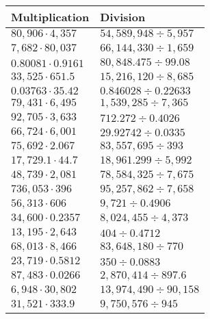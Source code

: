 \begin{longtable}[]{@{}ll@{}}
\toprule
Multiplication & Division\tabularnewline
\midrule
\endhead
\(80,906\cdot4,357\) & \(54,589,948÷5,957\)\tabularnewline
\(7,682\cdot80,037\) & \(66,144,330÷1,659\)\tabularnewline
\(0.80081\cdot0.9161\) & \(80,848.475÷99.08\)\tabularnewline
\(33,525\cdot651.5\) & \(15,216,120÷8,685\)\tabularnewline
\(0.03763\cdot35.42\) & \(0.846028÷0.22633\)\tabularnewline
\(79,431\cdot6,495\) & \(1,539,285÷7,365\)\tabularnewline
\(92,705\cdot3,633\) & \(712.272÷0.4026\)\tabularnewline
\(66,724\cdot6,001\) & \(29.92742÷0.0335\)\tabularnewline
\(75,692\cdot2.067\) & \(83,557,695÷393\)\tabularnewline
\(17,729.1\cdot44.7\) & \(18,961.299÷5,992\)\tabularnewline
\(48,739\cdot2,081\) & \(78,584,325÷7,675\)\tabularnewline
\(736,053\cdot396\) & \(95,257,862÷7,658\)\tabularnewline
\(56,313\cdot606\) & \(9,721÷0.4906\)\tabularnewline
\(34,600\cdot 0.2357\) & \(8,024,455÷4,373\)\tabularnewline
\(13,195\cdot2,643\) & \(404÷0.4712\)\tabularnewline
\(68,013\cdot8,466\) & \(83,648,180÷770\)\tabularnewline
\(23,719\cdot0.5812\) & \(350÷0.0883\)\tabularnewline
\(87,483\cdot0.0266\) & \(2,870,414÷897.6\)\tabularnewline
\(6,948\cdot30,802\) & \(13,974,490÷90,158\)\tabularnewline
\(31,521\cdot333.9\) & \(9,750,576÷945\)\tabularnewline
\bottomrule
\end{longtable}
